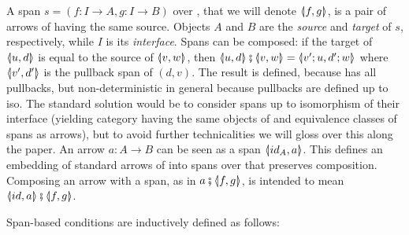 A span $s = (f: I \to A, g:I \to B)$ over , that we will denote $\spanof f g$, is a pair of arrows of  having the same source. Objects $A$ and $B$ are the \emph{source} and \emph{target} of $s$, respectively, while $I$ is its \emph{interface}. Spans can be composed: if the target of $\spanof u d$ is equal to the source of $\spanof v w$, then $\spanof u d \spcomp \spanof v w=\spanof{v';u}{d';w}$ where $\spanof {v'}{d'}$ is the pullback span of $(d,v)$. The result is defined, because  has all pullbacks, but non-deterministic in general because pullbacks are defined up to iso. The standard solution would be to consider spans up to isomorphism of their interface (yielding category {\SpanC} having the same objects of  and equivalence classes of spans as arrows), but to avoid further technicalities we will gloss over this along the paper.
An arrow $a:A \to B$ can be seen as a span $\spanof{id_A}{a}$. This defines an embedding of standard arrows of  into spans over  that preserves composition. Composing an arrow with a span, as in $a \spcomp \spanof f g$, is intended to mean $\spanof{id}{a}  \spcomp \spanof f g$.

\medskip
Span-based conditions are inductively defined as follows:


